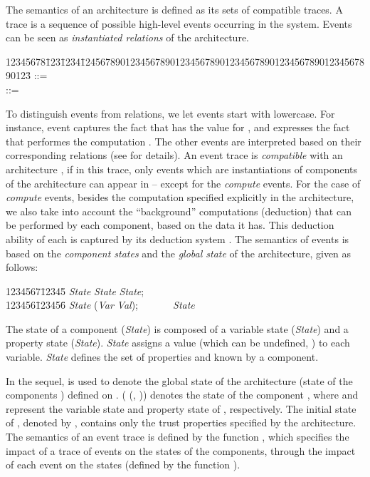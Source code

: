 \documentclass{llncs}
\begin{document}
The semantics of an architecture is defined as its sets of compatible traces. A trace is a 
sequence of possible high-level events occurring in the system. Events can be seen as 
\textit{instantiated relations} of the architecture. 

\small
\begin{tabbing}
    12345678\=123\=1234\=12456789012345678901234567890123456789012345678901234567890123\= \kill
    \>  \> ::= \> \\
    \>  \> ::= \>     \\
    \>\>\>    
\end{tabbing}
\normalsize

To distinguish events from relations, we let events start with lowercase. For instance, 
event  captures the fact that  has the value  
for , and  expresses the fact that 
 performes the computation . The other events are interpreted based on their 
corresponding relations (see \cite{TM-STM2014} for details). 
An event trace  is  \textit{compatible} with an architecture , 
if in this trace, only events which are instantiations of components of the architecture can 
appear in  -- except for the \textit{compute} events. For the case of \textit{compute} events, besides the computation specified explicitly in the architecture, we also take into account the ``background'' computations (deduction) that can be performed by each component, based on the data it has. 
This deduction ability of each  is captured by its deduction system  \cite{TM-STM2014}. 
The semantics of events is based on the \textit{component states} and the \textit{global state} of 
the architecture, given as follows: 
\small
\begin{tabbing}
    1234567\=12345\=\kill
    \> \textit{State} \>  \textit{State}  \textit{State};\\
    123456\=123456\=\kill
    \> \textit{State} \>  (\textit{Var}  \textit{Val});\ \ \ \ \ \ \ \textit{State}   
\end{tabbing}
\normalsize

The state of a component (\textit{State}) is composed of a variable state (\textit{State}) and a property state (\textit{State}). \textit{State} assigns a value (which can be
undefined, ) to each variable. \textit{State} defines the set of properties 
 and  known by a component. 

In the sequel,  is used to denote the global state of the architecture 
 (state of the components ) 
defined on .  (  (, ))  
denotes the state of the component , where  and  
represent the variable state and property state of , respectively.  
The initial state of , denoted by , contains 
only the trust properties specified by the architecture. 
The semantics of an event trace is defined by the function , which 
specifies the impact of a trace of events on the states of the 
components, through the impact of each event on the states (defined by the function ). 
\end{document}
